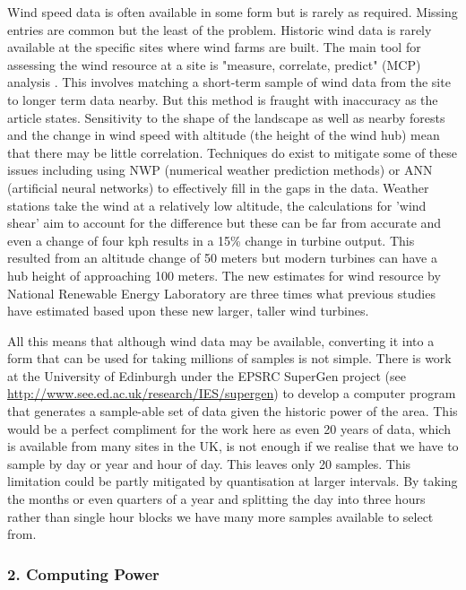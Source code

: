 \documentclass[a4paper,oneside,12pt]{report}
\begin{document}
Wind speed data is often available in some form but is rarely as required. Missing entries are common but the least of the problem. Historic wind data is rarely available at the specific sites where wind farms are built. The main tool for assessing the wind resource at a site is "measure, correlate, predict" (MCP) analysis \cite{Economist2010}. This involves matching a short-term sample of wind data from the site to longer term data nearby. But this method is fraught with inaccuracy as the article states. Sensitivity to the shape of the landscape as well as nearby forests and the change in wind speed with altitude (the height of the wind hub) mean that there may be little correlation. Techniques do exist to mitigate some of these issues including using NWP (numerical weather prediction methods) or ANN (artificial neural networks) to effectively fill in the gaps in the data. Weather stations take the wind at a relatively low altitude, the calculations for 'wind shear' aim to account for the difference but these can be far from accurate and even a change of four kph results in a 15\% change in turbine output. This resulted from an altitude change of 50 meters but modern turbines can have a hub height of approaching 100 meters. The new estimates for wind resource by National Renewable Energy Laboratory \cite{NationalRenewableEnergyLaboratory2010} are three times what previous studies have estimated based upon these new larger, taller wind turbines.

All this means that although wind data may be available, converting it into a form that can be used for taking millions of samples is not simple. There is work at the University of Edinburgh under the EPSRC SuperGen project (see \url{http://www.see.ed.ac.uk/research/IES/supergen}) to develop a computer program that generates a sample-able set of data given the historic power of the area. This would be a perfect compliment for the work here as even 20 years of data, which is available from many sites in the UK, is not enough if we realise that we have to sample by day or year and hour of day. This leaves only 20 samples. This limitation could be partly mitigated by quantisation at larger intervals. By taking the months or even quarters of a year and splitting the day into three hours rather than single hour blocks we have many more samples available to select from.

\subsubsection{2. Computing Power}
\end{document}
